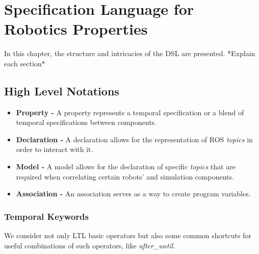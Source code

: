 \chapter{Specification Language for Robotics Properties}
\label{chap:language}


In this chapter, the structure and intricacies of the DSL are presented. *Explain each section*

\section{High Level Notations}

\begin{itemize}
\item \textbf{Property -} A property represents a temporal specification or a blend of temporal specifications between components.
\item \textbf{Declaration -} A declaration allows for the representation of ROS \textit{topics} in order to interact with it.
\item \textbf{Model -} A model allows for the declaration of specific \textit{topics} that are required when correlating certain robots' and simulation components.
\item \textbf{Association -} An association serves as a way to create program variables.
\end{itemize}

\subsection{Temporal Keywords}

We consider not only LTL basic operators but also some common shortcuts for useful combinations of such operators, like \textit{after\_until}.


